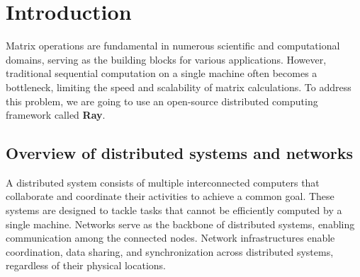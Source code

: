 \section{Introduction}
Matrix operations are fundamental in numerous scientific and computational domains, serving as the building blocks for various applications. However, traditional sequential computation on a single machine often becomes a bottleneck, limiting the speed and scalability of matrix calculations. To address this problem, we are going to use an open-source distributed computing framework called \textbf{Ray}.

\subsection{Overview of distributed systems and networks}
A distributed system consists of multiple interconnected computers that collaborate and coordinate their activities to achieve a common goal. These systems are designed to tackle tasks that cannot be efficiently computed by a single machine. Networks serve as the backbone of distributed systems, enabling communication among the connected nodes. Network infrastructures enable coordination, data sharing, and synchronization across distributed systems, regardless of their physical locations.

